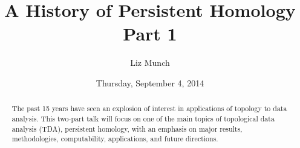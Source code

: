 \documentclass{UAmathtalk}
\author{Liz Munch}
\title{A History of Persistent Homology\\Part 1}
\date{Thursday, September 4, 2014}
\begin{document}
\maketitle

\begin{abstract}
The past 15 years have seen an explosion of interest in applications of topology to data analysis.
This two-part talk will focus on one of the main topics of topological data analysis (TDA), persistent homology, with an emphasis on major results, methodologies, computability, applications, and future directions.
\end{abstract}
\end{document}
